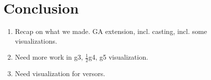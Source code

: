 \section{Conclusion}
\label{ch:conclusion}


\begin{enumerate}
  \item Recap on what we made. GA extension, incl. casting, incl. some visualizations.
  \item Need more work in g3, $\frac{1}{2}$g4, g5 visualization.
  \item Need visualization for versors.
\end{enumerate}
